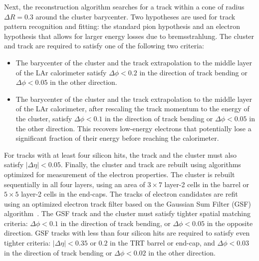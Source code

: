 Next, the reconstruction algorithm searches for a track within a cone of radius $\Delta R=0.3$ around the cluster barycenter. Two hypotheses are used for track pattern recognition and fitting: the standard pion hypothesis and an electron hypothesis that allows for larger energy losses due to bremsstrahlung. The cluster and track are required to satisfy one of the following two criteria:

\begin{itemize}
	\item The barycenter of the cluster and the track extrapolation to the middle layer of the LAr calorimeter satisfy $\Delta\phi<0.2$ in the direction of track bending or $\Delta\phi<0.05$ in the other direction. 
	\item The barycenter of the cluster and the track extrapolation to the middle layer of the LAr calorimeter, after rescaling the track momentum to the energy of the cluster, satisfy $\Delta\phi<0.1$ in the direction of track bending or $\Delta\phi<0.05$ in the other direction. This recovers low-energy electrons that potentially lose a significant fraction of their energy before reaching the calorimeter. 
\end{itemize}
 
For tracks with at least four silicon hits, the track and the cluster must also satisfy $|\Delta\eta|<0.05$. Finally, the cluster and track are rebuilt using algorithms optimized for measurement of the electron properties. The cluster is rebuilt sequentially in all four layers, using an area of $3\times7$ layer-2 cells in the barrel or $5\times5$ layer-2 cells in the end-caps. The tracks of electron candidates are refit using an optimized electron track filter based on the Gaussian Sum Filter (GSF) algorithm~\cite{TheATLASCollaboration:2012vr}. The GSF track and the cluster must satisfy tighter spatial matching criteria: $\Delta\phi<0.1$ in the direction of track bending, or $\Delta\phi<0.05$ in the opposite direction. GSF tracks with less than four silicon hits are required to satisfy even tighter criteria: $|\Delta\eta|<0.35$ or $0.2$ in the TRT barrel or end-cap, and $\Delta\phi<0.03$ in the direction of track bending or $\Delta\phi<0.02$ in the other direction. 

